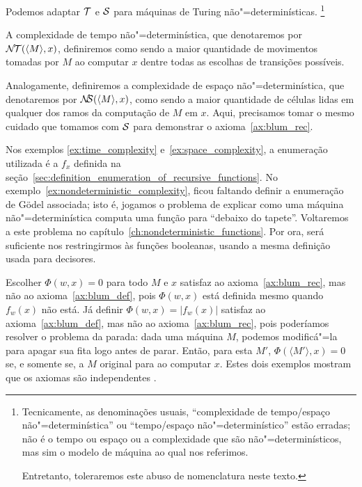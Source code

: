 \begin{example}
    \label{ex:nondeterministic_complexity}
    Podemos adaptar ${\mathcal{T}}$ e ${\mathcal{S}}$
    para máquinas de Turing não"=determinísticas.%
    \footnote{
        Tecnicamente,
        as denominações usuais,
        ``complexidade de tempo/espaço não"=determinística''
        ou ``tempo/espaço não"=determinístico''
        estão erradas;
        não é o tempo ou espaço ou a complexidade que são não"=determinísticos,
        mas sim o modelo de máquina ao qual nos referimos.

        Entretanto, toleraremos este abuso de nomenclatura neste texto.
    }

    A complexidade de tempo não"=determinística,
    que denotaremos por ${\mathcal{N\!T}}(\langle M \rangle, x)$,
    definiremos como sendo a maior quantidade de movimentos
    tomadas por $M$ ao computar $x$
    dentre todas as escolhas de transições possíveis.

    Analogamente,
    definiremos a complexidade de espaço não"=determinística,
    que denotaremos por ${\mathcal{N\!\!S}}(\langle M \rangle, x)$,
    como sendo a maior quantidade de células lidas
    em qualquer dos ramos da computação de $M$ em $x$.
    Aqui, precisamos tomar o mesmo cuidado que tomamos
    com ${\mathcal{S}}$ para demonstrar o axioma~\ref{ax:blum_rec}.
\end{example}

Nos exemplos \ref{ex:time_complexity} e~\ref{ex:space_complexity},
a enumeração utilizada é a $f_x$
definida na seção~\ref{sec:definition_enumeration_of_recursive_functions}.
No exemplo~\ref{ex:nondeterministic_complexity},
ficou faltando definir a enumeração de Gödel associada;
isto é, jogamos o problema de
explicar como uma máquina não"=determinística computa uma função
para ``debaixo do tapete''.
Voltaremos a este problema no capítulo~\ref{ch:nondeterministic_functions}.
Por ora,
será suficiente nos restringirmos às funções booleanas,
usando a mesma definição usada para decisores.

\begin{example}
    Escolher $\Phi(w, x) = 0$ para todo $M$ e $x$
    satisfaz ao axioma~\ref{ax:blum_rec},
    mas não ao axioma~\ref{ax:blum_def},
    pois $\Phi(w, x)$ está definida mesmo quando $f_w(x)$ não está.
    Já definir $\Phi(w, x) = |f_w(x)|$
    satisfaz ao axioma~\ref{ax:blum_def},
    mas não ao axioma~\ref{ax:blum_rec},
    pois poderíamos resolver o problema da parada:
    dada uma máquina $M$, podemos modificá"=la
    para apagar sua fita logo antes de parar.
    Então, para esta $M'$,
    $\Phi(\langle M' \rangle, x) = 0$ se, e somente se,
    a $M$ original para ao computar $x$.
    Estes dois exemplos mostram que os axiomas são independentes
    \cite[p.~3]{Blum1967}.
\end{example}

